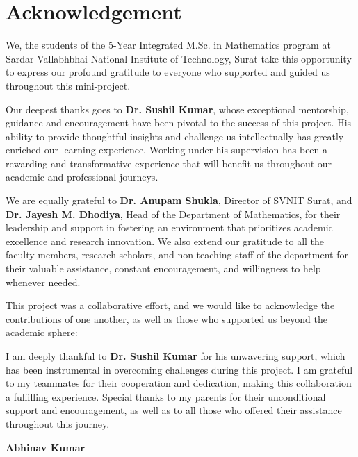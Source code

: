 \chapter*{Acknowledgement}%

	We, the students of the 5-Year Integrated M.Sc. in Mathematics program at Sardar Vallabhbhai National Institute of Technology, Surat take this opportunity to express our profound gratitude to everyone who supported and guided us throughout this mini-project.
	\vspace{0.2cm} 
	
	Our deepest thanks goes to \textbf{Dr. Sushil Kumar}, whose exceptional mentorship, guidance and encouragement have been pivotal to the success of this project. His ability to provide thoughtful insights and challenge us intellectually has greatly enriched our learning experience. Working under his supervision has been a rewarding and transformative experience that will benefit us throughout our academic and professional journeys.
	\vspace{0.2cm} 
	
	We are equally grateful to \textbf{Dr. Anupam Shukla}, Director of SVNIT Surat, and \textbf{Dr. Jayesh M. Dhodiya}, Head of the Department of Mathematics, for their leadership and support in fostering an environment that prioritizes academic excellence and research innovation. We also extend our gratitude to all the faculty members, research scholars, and non-teaching staff of the department for their valuable assistance, constant encouragement, and willingness to help whenever needed.
	\vspace{0.3cm} 
	
	This project was a collaborative effort, and we would like to acknowledge the contributions of one another, as well as those who supported us beyond the academic sphere:
	
	\vspace{0.3cm}
	
	I am deeply thankful to \textbf{Dr. Sushil Kumar} for his unwavering support, which has been instrumental in overcoming challenges during this project. I am grateful to my teammates for their cooperation and dedication, making this collaboration a fulfilling experience. Special thanks to my parents for their unconditional support and encouragement, as well as to all those who offered their assistance throughout this journey.
	
	\vspace{0.1cm} 
	\hfill \textbf{Abhinav Kumar} 
	
